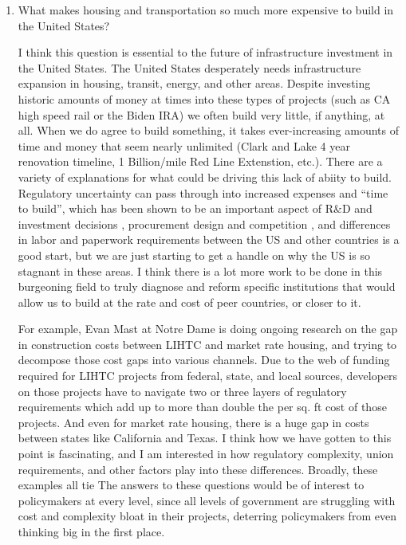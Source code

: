 \documentclass{article}
\begin{document}
\begin{enumerate}
    \item What makes housing and transportation so much more expensive to build in the United States? 

    I think this question is essential to the future of infrastructure investment in the United States. 
    The United States desperately needs infrastructure expansion in housing, transit, energy, and other areas. 
    Despite investing historic amounts of money at times into these types of projects (such as CA high speed rail or the Biden IRA) we often build very little, 
    if anything, at all. When we do agree to build something, it takes ever-increasing amounts of time and money that seem nearly unlimited (Clark and Lake 4 year renovation timeline, 1 Billion/mile Red Line Extenstion, etc.). 
    There are a variety of explanations for what could be driving this lack of abiity to build. 
    Regulatory uncertainty can pass through into increased expenses and ``time to build'', which has been shown to be an important aspect of R\&D and investment decisions \cite{budish_firms_2015}, procurement design and competition \cite{currier_competition_2026}, and differences in labor and paperwork requirements between the US and other countries is a good start, but we are just starting to get a handle on why the US is so stagnant in these areas.
    I think there is a lot more work to be done in this burgeoning field to truly diagnose and reform specific institutions that would allow us to build at the rate and cost of peer countries, or closer to it. 

    For example, Evan Mast at Notre Dame is doing ongoing research on the gap in construction costs between LIHTC and market rate housing, and trying to decompose those cost gaps into various channels. 
    Due to the web of funding required for LIHTC projects from federal, state, and local sources, developers on those projects have to navigate two or three layers of 
    regulatory requirements which add up to more than double the per sq. ft cost of those projects. And even for market rate housing, there is a huge gap in costs between states like California and Texas. 
    I think how we have gotten to this point is fascinating, and I am interested in how regulatory complexity, union requirements, and other factors play into these differences. 
    Broadly, these examples all tie 
    The answers to these questions would be of interest to policymakers at every level, since all levels of government are struggling with cost and complexity bloat in their projects, deterring policymakers from even thinking big in the first place. 


\end{enumerate}
\end{document}
